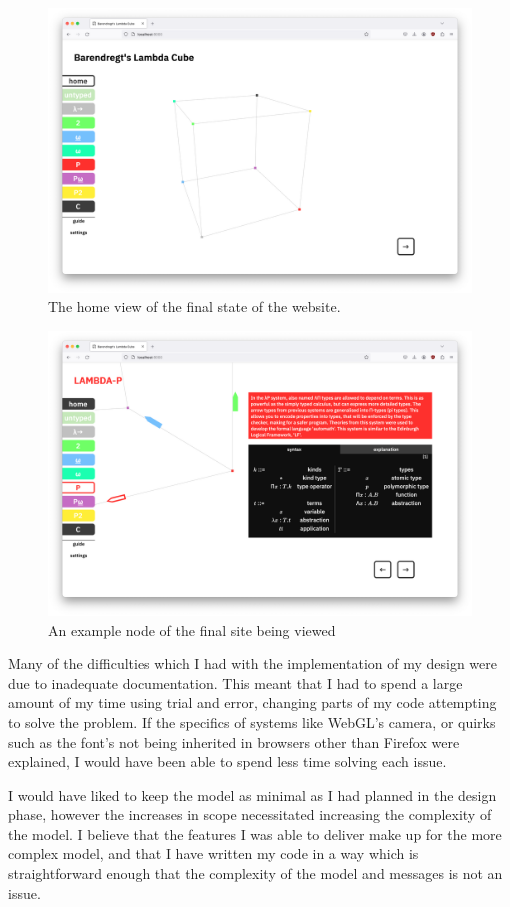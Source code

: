 \documentclass{l4proj}
\begin{document}
\begin{figure}[h!]
    \centering
    \includegraphics[width=0.8\linewidth]{dissertation/images/final_home.png}
    \caption{The home view of the final state of the website.}
    \label{fig:enter-label}
\end{figure}

\begin{figure}[h!]
    \centering
    \includegraphics[width=0.8\linewidth]{dissertation/images/final_zoomed.png}
    \caption{An example node of the final site being viewed}
    \label{fig:enter-label}
\end{figure}

Many of the difficulties which I had with the implementation of my design were due to inadequate documentation.  This meant that I had to spend a large amount of my time using trial and error, changing parts of my code attempting to solve the problem.  If the specifics of systems like WebGL's camera, or quirks such as the font's not being inherited in browsers other than Firefox were explained, I would have been able to spend less time solving each issue.

I would have liked to keep the model as minimal as I had planned in the design phase, however the increases in scope necessitated increasing the complexity of the model.  I believe that the features I was able to deliver make up for the more complex model, and that I have written my code in a way which is straightforward enough that the complexity of the model and messages is not an issue.
\end{document}
